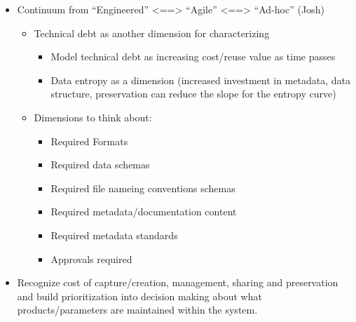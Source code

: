 \documentclass[paper]{ijdc-v9}
\providecommand{\tightlist}{%
  \setlength{\itemsep}{0pt}\setlength{\parskip}{0pt}}
\begin{document}
\begin{itemize}
\tightlist
\item
  Continuum from ``Engineered'' \textless{}==\textgreater{} ``Agile''
  \textless{}==\textgreater{} ``Ad-hoc'' (Josh)

  \begin{itemize}
  \tightlist
  \item
    Technical debt as another dimension for characterizing

    \begin{itemize}
    \tightlist
    \item
      Model technical debt as increasing cost/reuse value as time passes
    \item
      Data entropy as a dimension (increased investment in metadata,
      data structure, preservation can reduce the slope for the entropy
      curve)
    \end{itemize}
  \item
    Dimensions to think about:

    \begin{itemize}
    \tightlist
    \item
      Required Formats
    \item
      Required data schemas
    \item
      Required file nameing conventions schemas
    \item
      Required metadata/documentation content
    \item
      Required metadata standards
    \item
      Approvals required
    \end{itemize}
  \end{itemize}
\item
  Recognize cost of capture/creation, management, sharing and
  preservation and build prioritization into decision making about what
  products/parameters are maintained within the system.
\end{itemize}
\end{document}
